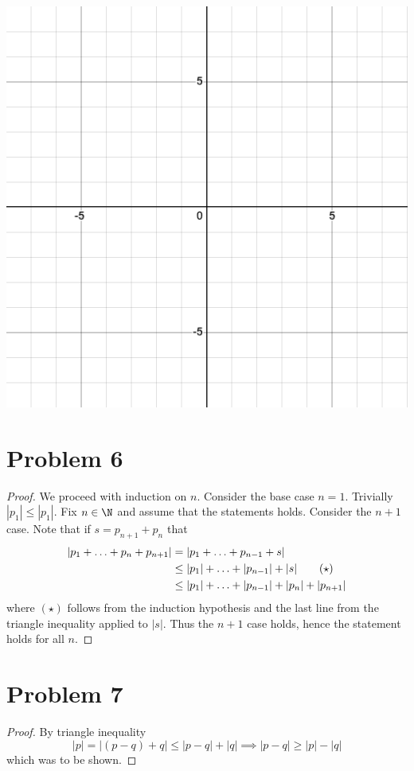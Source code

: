 \documentclass{eeleyes}
\begin{document}
\begin{enumerate}[label=\alph*)]
    \begin{center}
        \includegraphics[width=0.4\linewidth]{figures/problem5_c.png}
    \end{center}
\end{enumerate}

\section*{Problem 6}
\begin{proof}
    We proceed with induction on $n$. Consider the base case $n = 1$. Trivially $|p_1| \leq |p_1|$. Fix $n \in \N$ and assume that the statements holds. Consider the $n+1$ case. Note that if $s = p_{n+1} + p_{n}$ that
    \begin{align*}
        \qty|p_1 + \ldots + p_{n} + p_{n+1}| &= \qty|p_1 + \ldots + p_{n-1} + s| \\
                                             &\leq \qty|p_1| + \ldots + \qty|p_{n-1}| + \qty|s| \tag{$\star$} \\
                                             &\leq \qty|p_1| + \ldots + \qty|p_{n-1}| + \qty|p_{n}| + \qty|p_{n+1}|
    \end{align*}
    where $(\star)$ follows from the induction hypothesis and the last line from the triangle inequality applied to $|s|$. Thus the $n+1$ case holds, hence the statement holds for all $n$.
\end{proof}

\section*{Problem 7}
\begin{proof}
    By triangle inequality
    \[
        |p| = |(p-q) + q| \leq |p-q| + |q| \implies |p-q| \geq |p| - |q|
    \]
    which was to be shown.
\end{proof}
\end{document}
